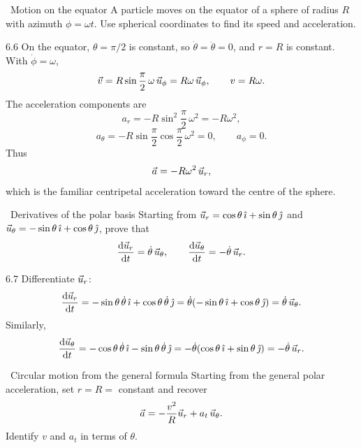 \begin{exercise}{\core\ Motion on the equator}
A particle moves on the equator of a sphere of radius $R$ with azimuth
$\phi=\omega t$. Use spherical coordinates to find its speed and acceleration.
\end{exercise}

\begin{tabletworkspace}[6.5cm]
\end{tabletworkspace}

\begin{solution}{6.6}
On the equator, $\theta=\pi/2$ is constant, so
$\dot\theta=\ddot\theta=0$, and $r=R$ is constant. With $\dot\phi=\omega$,
\[
\vec v=R\sin\frac{\pi}{2}\,\omega\,\vec{u}_\phi=R\omega\,\vec{u}_\phi,
\qquad v=R\omega.
\]
The acceleration components are
\[
a_r=-R\sin^2\frac{\pi}{2}\,\omega^2=-R\omega^2,
\]
\[
a_\theta=-R\sin\frac{\pi}{2}\cos\frac{\pi}{2}\,\omega^2=0,
\qquad a_\phi=0.
\]
Thus
\[
\vec a=-R\omega^2\,\vec{u}_r,
\]
which is the familiar centripetal acceleration toward the centre of the sphere.
\end{solution}

\begin{exercise}{\core\ Derivatives of the polar basis}
Starting from
$\vec{u}_r=\cos\theta\,\hat{\imath}+\sin\theta\,\hat{\jmath}$ and
$\vec{u}_\theta=-\sin\theta\,\hat{\imath}+\cos\theta\,\hat{\jmath}$, prove that
\[
\frac{\mathrm{d}\vec{u}_r}{\mathrm{d} t}=\dot\theta\,\vec{u}_\theta,\qquad
\frac{\mathrm{d}\vec{u}_\theta}{\mathrm{d} t}=-\dot\theta\,\vec{u}_r.
\]
\end{exercise}

\begin{tabletworkspace}[6.5cm]
\end{tabletworkspace}

\begin{solution}{6.7}
Differentiate $\vec{u}_r$:
\[
\frac{\mathrm{d}\vec{u}_r}{\mathrm{d} t}
=-\sin\theta\,\dot\theta\,\hat{\imath}+\cos\theta\,\dot\theta\,\hat{\jmath}
=\dot\theta(-\sin\theta\,\hat{\imath}+\cos\theta\,\hat{\jmath})
=\dot\theta\,\vec{u}_\theta.
\]
Similarly,
\[
\frac{\mathrm{d}\vec{u}_\theta}{\mathrm{d} t}
=-\cos\theta\,\dot\theta\,\hat{\imath}-\sin\theta\,\dot\theta\,\hat{\jmath}
=-\dot\theta(\cos\theta\,\hat{\imath}+\sin\theta\,\hat{\jmath})
=-\dot\theta\,\vec{u}_r.
\]
\end{solution}

\begin{exercise}{\core\ Circular motion from the general formula}
Starting from the general polar acceleration, set $r=R=$ constant and recover
\[
\vec a=-\frac{v^2}{R}\vec{u}_r+a_t\,\vec{u}_\theta.
\]
Identify $v$ and $a_t$ in terms of $\theta$.
\end{exercise}

\begin{tabletworkspace}[6.5cm]
\end{tabletworkspace}

